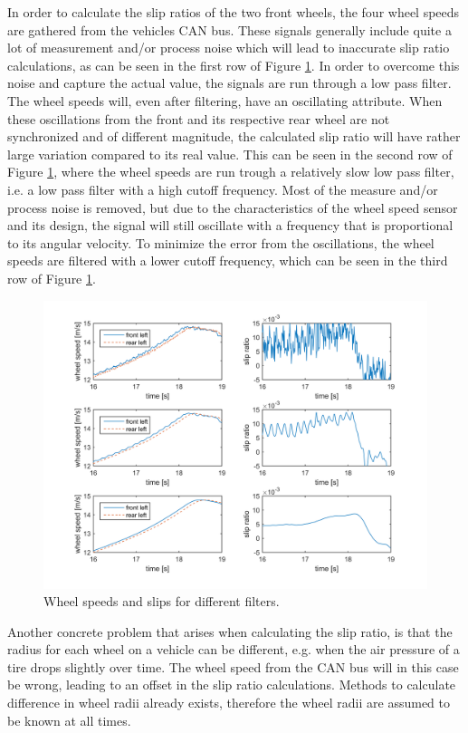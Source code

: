 In order to calculate the slip ratios of the two front wheels, the four wheel speeds are gathered from the vehicles CAN bus. These signals generally include quite a lot of measurement and/or process noise which will lead to inaccurate slip ratio calculations, as can be seen in the first row of Figure \ref{wheel_speed_and_slip}. In order to overcome this noise and capture the actual value, the signals are run through a low pass filter. The wheel speeds will, even after filtering, have an oscillating attribute. When these oscillations from the front and its respective rear wheel are not synchronized and of different magnitude, the calculated slip ratio will have rather large variation compared to its real value. This can be seen in the second row of Figure \ref{wheel_speed_and_slip}, where the wheel speeds are run trough a relatively slow low pass filter, i.e. a low pass filter with a high cutoff frequency. Most of the measure and/or process noise is removed, but due to the characteristics of the wheel speed sensor and its design, the signal will still oscillate with a frequency that is proportional to its angular velocity. To minimize the error from the oscillations, the wheel speeds are filtered with a lower cutoff frequency, which can be seen in the third row of Figure \ref{wheel_speed_and_slip}. 
\begin{figure}[h]
	\centering
	\includegraphics[width=1.0\textwidth]{Pictures/wheel_speed_and_slip}
	\caption {Wheel speeds and slips for different filters.}
	\label{wheel_speed_and_slip}
\end{figure}
Another concrete problem that arises when calculating the slip ratio, is that the radius for each wheel on a vehicle can be different, e.g. when the air pressure of a tire drops slightly over time. The wheel speed from the CAN bus will in this case be wrong, leading to an offset in the slip ratio calculations. Methods to calculate difference in wheel radii already exists, therefore the wheel radii are assumed to be known at all times.

